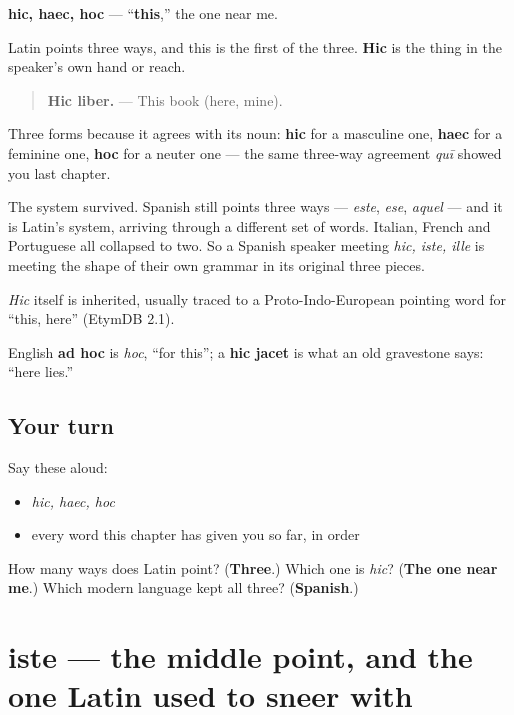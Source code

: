 \begin{cousinweb}
\textbf{hic, haec, hoc} — \textquotedblleft{}\textbf{this},\textquotedblright{} the one near me.

Latin points three ways, and this is the first of the three. \textbf{Hic} is the thing in the speaker's own hand or reach.

\begin{quote}
\textbf{Hic liber.} — This book (here, mine).
\end{quote}

Three forms because it agrees with its noun: \textbf{hic} for a masculine one, \textbf{haec} for a feminine one, \textbf{hoc} for a neuter one — the same three-way agreement \emph{quī} showed you last chapter.

The system survived. Spanish still points three ways — \emph{este}, \emph{ese}, \emph{aquel} — and it is Latin's system, arriving through a different set of words. Italian, French and Portuguese all collapsed to two. So a Spanish speaker meeting \emph{hic, iste, ille} is meeting the shape of their own grammar in its original three pieces.

\emph{Hic} itself is inherited, usually traced to a Proto-Indo-European pointing word for \textquotedblleft{}this, here\textquotedblright{} (EtymDB 2.1).

English \textbf{ad hoc} is \emph{hoc}, \textquotedblleft{}for this\textquotedblright{}; a \textbf{hic jacet} is what an old gravestone says: \textquotedblleft{}here lies.\textquotedblright{}
\end{cousinweb}

\subsection*{Your turn}
Say these aloud:

\begin{itemize}
\raggedright
  \item \emph{hic, haec, hoc}
  \item every word this chapter has given you so far, in order
\end{itemize}

\begin{tcolorbox}[breakable,colback=teal!4,colframe=teal!35!black,title={Before you move on}]
How many ways does Latin point? (\textbf{Three}.) Which one is \emph{hic}? (\textbf{The one near me}.) Which modern language kept all three? (\textbf{Spanish}.)
\end{tcolorbox}
\section[iste, ista, istud]{iste — the middle point, and the one Latin used to sneer with}

